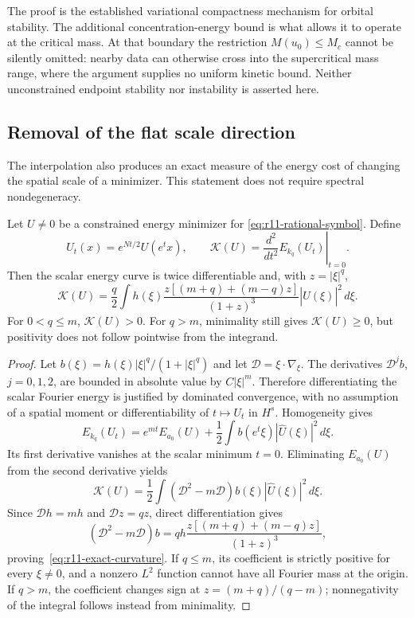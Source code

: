 The proof is the established variational compactness mechanism for
orbital stability.  The additional concentration-energy bound is what
allows it to operate at the critical mass.  At that boundary the
restriction $M(u_0)\le M_c$ cannot be silently omitted: nearby data can
otherwise cross into the supercritical mass range, where the argument
supplies no uniform kinetic bound.  Neither unconstrained endpoint
stability nor instability is asserted here.

\subsection{Removal of the flat scale direction}

The interpolation also produces an exact measure of the energy cost of
changing the spatial scale of a minimizer.  This statement does not
require spectral nondegeneracy.

\begin{proposition}
\label{prop:r11-scale-curvature}
Let $U\ne0$ be a constrained energy minimizer for
\eqref{eq:r11-rational-symbol}.  Define
\[
 U_t(x)=e^{Nt/2}U(e^tx),\qquad
 \mathcal K(U)=\left.\frac{d^2}{dt^2}E_{k_q}(U_t)\right|_{t=0}.
\]
Then the scalar energy curve is twice differentiable and, with
$z=|\xi|^q$,
\begin{equation}\label{eq:r11-exact-curvature}
 \mathcal K(U)=\frac q2\int
 h(\xi)\frac{z[(m+q)+(m-q)z]}{(1+z)^3}
                    |\widehat U(\xi)|^2\,d\xi.
\end{equation}
For $0<q\le m$, $\mathcal K(U)>0$.  For $q>m$, minimality still
gives $\mathcal K(U)\ge0$, but positivity does not follow pointwise
from the integrand.
\end{proposition}

\begin{proof}
Let $b(\xi)=h(\xi)|\xi|^q/(1+|\xi|^q)$ and let
$\mathcal D=\xi\cdot\nabla_\xi$.  The derivatives
$\mathcal D^jb$, $j=0,1,2$, are bounded in absolute value by
$C|\xi|^m$.  Therefore differentiating the scalar Fourier energy is
justified by dominated convergence, with no assumption of a spatial
moment or differentiability of $t\mapsto U_t$ in $H^s$.  Homogeneity
gives
\[
 E_{k_q}(U_t)=e^{mt}E_{a_0}(U)
                 +\frac12\int b(e^t\xi)|\widehat U(\xi)|^2\,d\xi.
\]
Its first derivative vanishes at the scalar minimum $t=0$.  Eliminating
$E_{a_0}(U)$ from the second derivative yields
\[
 \mathcal K(U)=\frac12\int(\mathcal D^2-m\mathcal D)b(\xi)
                                    |\widehat U(\xi)|^2\,d\xi.
\]
Since $\mathcal Dh=mh$ and $\mathcal Dz=qz$, direct differentiation
gives
\[
 (\mathcal D^2-m\mathcal D)b
      =q h\frac{z[(m+q)+(m-q)z]}{(1+z)^3},
\]
proving~\eqref{eq:r11-exact-curvature}.  If $q\le m$, its coefficient
is strictly positive for every $\xi\ne0$, and a nonzero $L^2$ function
cannot have all Fourier mass at the origin.  If $q>m$, the coefficient
changes sign at $z=(m+q)/(q-m)$; nonnegativity of the integral follows
instead from minimality.
\end{proof}

